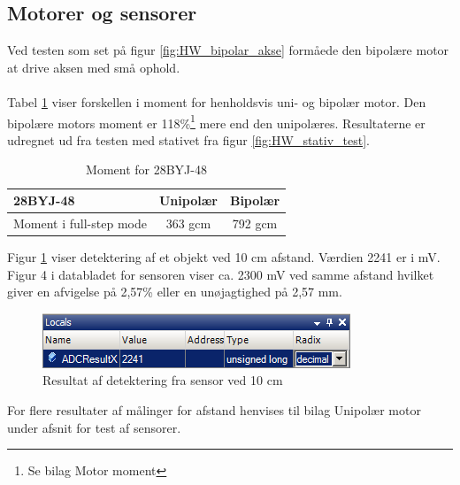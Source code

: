 \subsection{Motorer og sensorer}
Ved testen som set på figur \ref{fig:HW_bipolar_akse} formåede den bipolære motor at drive aksen med små ophold.
\\
\\
Tabel \ref{tab:motor_moment} viser forskellen i moment for henholdsvis uni- og bipolær motor. Den bipolære motors moment er 118\%\footnote{Se bilag Motor moment} mere end den unipolæres. Resultaterne er udregnet ud fra testen med stativet fra figur \ref{fig:HW_stativ_test}.

\begin{table}[H]
  	\centering
	\begin{tabular}{ |l|c|c| }
  		\hline
  		\textbf{28BYJ-48} & Unipolær & Bipolær\\
  		\hline
  		Moment i full-step mode & 363 gcm & 792 gcm \\
  		\hline
	\end{tabular}
	\caption[]{Moment for 28BYJ-48\footnotemark}
	\label{tab:motor_moment}
\end{table}

\noindent
Figur \ref{Sensor_10cm} viser detektering af et objekt ved 10 cm afstand. Værdien 2241 er i mV. Figur 4 i databladet for sensoren viser ca. 2300 mV ved samme afstand hvilket giver en afvigelse på 2,57\% eller en unøjagtighed på 2,57 mm.

\begin{figure}[H]
	\includegraphics[scale=1]{tex/Test/Motor-sensor/Sensor_10cm.png}
	\caption{Resultat af detektering fra sensor ved 10 cm}
	\label{Sensor_10cm}
\end{figure}

\noindent
For flere resultater af målinger for afstand henvises til bilag Unipolær motor under afsnit for test af sensorer.